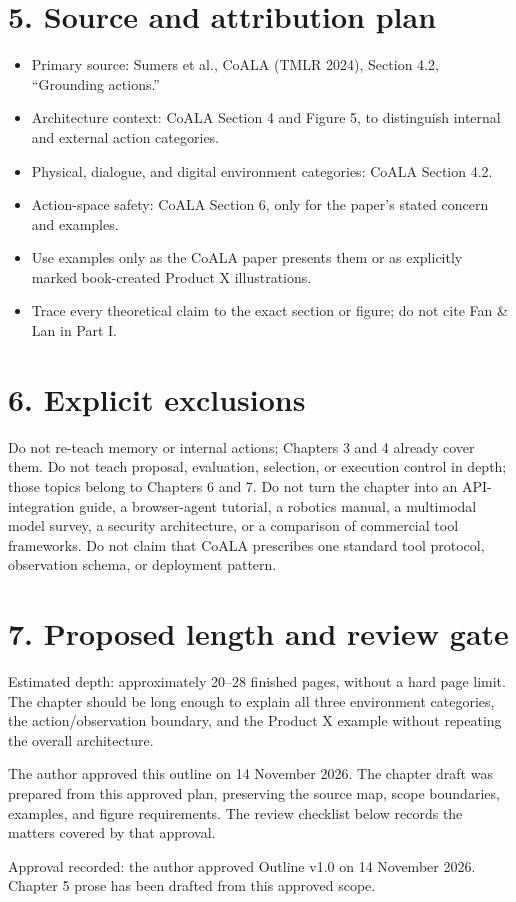 \section*{5. Source and attribution plan}
\begin{itemize}
  \item Primary source: Sumers et al., CoALA (TMLR 2024), Section 4.2, ``Grounding actions.''
  \item Architecture context: CoALA Section 4 and Figure 5, to distinguish internal and external action categories.
  \item Physical, dialogue, and digital environment categories: CoALA Section 4.2.
  \item Action-space safety: CoALA Section 6, only for the paper's stated concern and examples.
  \item Use examples only as the CoALA paper presents them or as explicitly marked book-created Product X illustrations.
  \item Trace every theoretical claim to the exact section or figure; do not cite Fan \& Lan in Part I.
\end{itemize}

\section*{6. Explicit exclusions}
Do not re-teach memory or internal actions; Chapters 3 and 4 already cover them. Do not teach proposal, evaluation, selection, or execution control in depth; those topics belong to Chapters 6 and 7. Do not turn the chapter into an API-integration guide, a browser-agent tutorial, a robotics manual, a multimodal model survey, a security architecture, or a comparison of commercial tool frameworks. Do not claim that CoALA prescribes one standard tool protocol, observation schema, or deployment pattern.

\section*{7. Proposed length and review gate}
Estimated depth: approximately 20--28 finished pages, without a hard page limit. The chapter should be long enough to explain all three environment categories, the action/observation boundary, and the Product X example without repeating the overall architecture.

\begin{takeawaybox}
The author approved this outline on 14 November 2026. The chapter draft was prepared from this approved plan, preserving the source map, scope boundaries, examples, and figure requirements. The review checklist below records the matters covered by that approval.

Approval recorded: the author approved Outline v1.0 on 14 November 2026. Chapter 5 prose has been drafted from this approved scope.
\end{takeawaybox}

